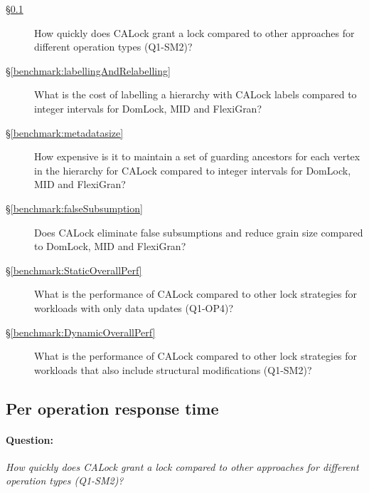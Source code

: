 \begin{description}
		\item[\S \ref{benchmark:PerOpLatency}] How quickly does CALock grant a lock compared to other approaches for different operation types (Q1-SM2)?
		
		\item[\S \ref{benchmark:labellingAndRelabelling}] What is the cost of labelling a hierarchy with CALock labels compared to integer intervals for DomLock, MID and FlexiGran?
		
		\item [\S \ref{benchmark:metadatasize}] How expensive is it to maintain a set of guarding ancestors for each vertex in the hierarchy for CALock compared to integer intervals for DomLock, MID and FlexiGran? 
	
		\item[\S \ref{benchmark:falseSubsumption}] Does CALock eliminate false subsumptions and reduce grain size compared to DomLock, MID and FlexiGran?
		\item[\S \ref{benchmark:StaticOverallPerf}] What is the performance of CALock compared to other lock strategies for workloads with only data updates (Q1-OP4)?
	
		\item[\S \ref{benchmark:DynamicOverallPerf}] What is the performance of CALock compared to other lock strategies for workloads that also include structural modifications (Q1-SM2)?
	\end{description}
	
	
\subsection{Per operation response time} \label{benchmark:PerOpLatency}

\paragraph{Question:} \emph{How quickly does CALock grant a lock compared to other approaches for different operation types (Q1-SM2)?}

